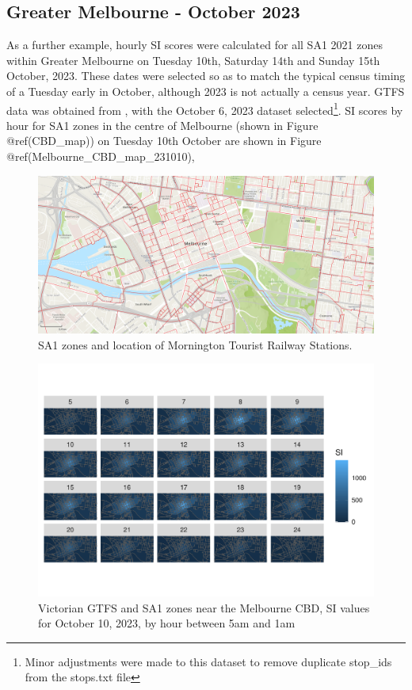 \documentclass[preprint, 3p,
authoryear]{elsarticle} %
\begin{document}
\hypertarget{greater-melbourne---october-2023}{%
\subsection{Greater Melbourne - October
2023}\label{greater-melbourne---october-2023}}

As a further example, hourly SI scores were calculated for all SA1 2021
zones within Greater Melbourne on Tuesday 10th, Saturday 14th and Sunday
15th October, 2023. These dates were selected so as to match the typical
census timing of a Tuesday early in October, although 2023 is not
actually a census year. GTFS data was obtained from
\citet{transitfeeds_victoria:2023aa}, with the October 6, 2023 dataset
selected\footnote{Minor adjustments were made to this dataset to remove
  duplicate stop\_ids from the stops.txt file}. SI scores by hour for
SA1 zones in the centre of Melbourne (shown in Figure @ref(CBD\_map)) on
Tuesday 10th October are shown in Figure
@ref(Melbourne\_CBD\_map\_231010),

\begin{figure}
\includegraphics[width=1\linewidth]{graphics/Melbourne_cbd} \caption{SA1 zones and location of Mornington Tourist Railway Stations.}\label{fig:CBD_map}
\end{figure}

\begin{figure}
\centering
\includegraphics{Leveraging_GTFS_to_assess_transit_supply_Transport_Geography_files/figure-latex/Melbourne_CBD_map_231010-1.pdf}
\caption{Victorian GTFS and SA1 zones near the Melbourne CBD, SI values
for October 10, 2023, by hour between 5am and 1am}
\end{figure}
\end{document}
